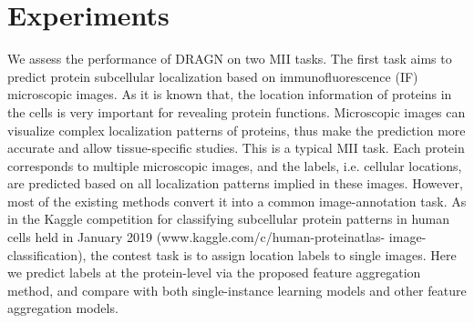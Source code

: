 \documentclass[10pt,twocolumn,letterpaper]{article}
\begin{document}




\section{Experiments}
We assess the performance of DRAGN on two MII tasks. The first task aims to predict protein subcellular localization based on immunofluorescence (IF) microscopic images. As it is known that, the location information of proteins in the cells is very important for revealing protein functions. Microscopic images can visualize complex localization patterns of proteins, thus make the prediction more accurate and allow tissue-specific studies. This is a typical MII task. Each protein corresponds to multiple microscopic images, and the labels, i.e. cellular locations, are predicted based on all localization patterns implied in these images. However, most of the existing methods convert it into a common image-annotation task. As in the Kaggle competition for classifying subcellular protein patterns in human cells held in January 2019 (www.kaggle.com/c/human-proteinatlas-
image-classification), the contest task is to assign location labels to single images. Here we predict labels at the protein-level via the proposed feature aggregation method, and compare with both single-instance learning models and other feature aggregation models.
\end{document}

